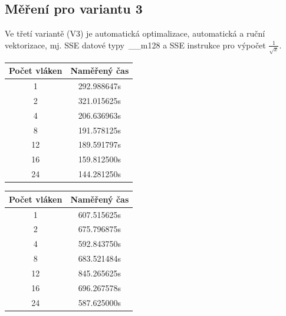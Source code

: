 \documentclass[12pt]{article}
\begin{document}
\subsection{Měření pro variantu 3}
Ve třetí variantě (V3) je automatická optimalizace, automatická a ruční vektorizace, mj. SSE datové typy~\_\_m128 a SSE in\-struk\-ce pro výpočet ${\frac{1}{\sqrt{x}}}$.
\begin{table}[H]
\parbox{.45\linewidth}{
%
%
\begin{center}
\begin{tabular}{ c | c }
\textbf{Počet vláken} & \textbf{Naměřený čas} \\ \hline \hline 
1 & 292.988647s \\ \hline
2 & 321.015625s \\ \hline
4 & 206.636963s \\ \hline
8 & 191.578125s \\ \hline
12 & 189.591797s \\ \hline
16 & 159.812500s \\ \hline
24 & 144.281250s \\ \hline
\end{tabular}
\end{center}
} \hfill
\parbox{.45\linewidth}{
%
%
\begin{center}
\begin{tabular}{ c | c }
\textbf{Počet vláken} & \textbf{Naměřený čas} \\ \hline \hline 
1 & 607.515625s \\ \hline
2 & 675.796875s \\ \hline
4 & 592.843750s \\ \hline
8 & 683.521484s \\ \hline
12 & 845.265625s \\ \hline
16 & 696.267578s \\ \hline
24 & 587.625000s \\ \hline
\end{tabular}
\end{center}
}
\end{table}
\end{document}
